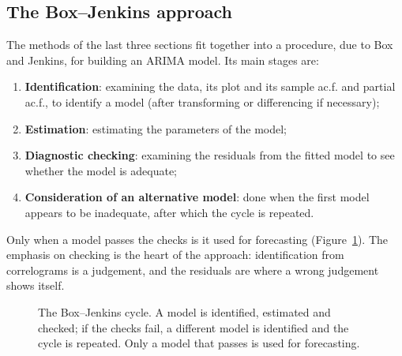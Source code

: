 \documentclass[11pt,a4paper]{article}
\theoremstyle{definition}
\begin{document}
\subsection{The Box--Jenkins approach}
The methods of the last three sections fit together into a procedure, due to Box and Jenkins, for building an
ARIMA model. Its main stages are:
\begin{enumerate}
\item \textbf{Identification}: examining the data, its plot and its sample ac.f. and partial ac.f., to identify a model
(after transforming or differencing if necessary);
\item \textbf{Estimation}: estimating the parameters of the model;
\item \textbf{Diagnostic checking}: examining the residuals from the fitted model to see whether the model is
adequate;
\item \textbf{Consideration of an alternative model}: done when the first model appears to be inadequate, after
which the cycle is repeated.
\end{enumerate}
Only when a model passes the checks is it used for forecasting (Figure~\ref{fig:box-jenkins}). The emphasis on checking
is the heart of the approach: identification from correlograms is a judgement, and the residuals are where a
wrong judgement shows itself.

\begin{figure}[H]
\centering
{}
\caption{The Box--Jenkins cycle. A model is identified, estimated and checked; if the checks fail, a different
model is identified and the cycle is repeated. Only a model that passes is used for forecasting.}
\label{fig:box-jenkins}
\end{figure}
\end{document}
